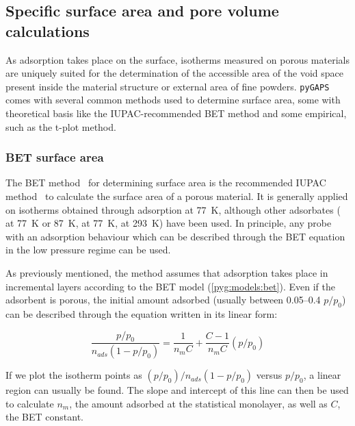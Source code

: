 
\subsection{Specific surface area and pore volume calculations}

As adsorption takes place on the surface,
isotherms measured on porous materials are uniquely suited
for the determination of the accessible area of the void
space present inside the material structure or external
area of fine powders. \texttt{pyGAPS} comes with several
common methods used to
determine surface area, some with theoretical basis like
the IUPAC-recommended BET method and some empirical, such
as the t-plot method.

\subsubsection{BET surface area}\label{pyg:charac:betarea}

The BET method~\cite{brunauerAdsorptionGasesMultimolecular1938}
for determining surface area is the recommended IUPAC method~\cite{thommesPhysisorptionGasesSpecial2015}
to calculate the surface area of a porous material.
It is generally applied on isotherms obtained through 
adsorption at \SI{77}{\kelvin}, although other adsorbates
( at \SI{77}{\kelvin} or \SI{87}{\kelvin},
 at \SI{77}{\kelvin},  at \SI{293}{\kelvin})
have been used. In principle, any probe with an adsorption behaviour
which can be described through the BET equation in the low pressure regime
can be used.

As previously mentioned, the method assumes that adsorption takes place
in incremental layers according to the
BET model (\autoref{pyg:models:bet}).
Even if the adsorbent is porous, the initial amount adsorbed
(usually between 0.05--0.4 \(p/p_0\)) can be
described through the equation written in its linear form:

\begin{equation}
	\frac{p/p_0}{n_{ads} (1-p/p_0)} = \frac{1}{n_{m} C} + \frac{C - 1}{n_{m} C}(p/p_0)
\end{equation}

If we plot the isotherm points as
\({(p/p_0)}/{n_{ads}(1-p/p_0)}\) versus \(p/p_0\), a linear region
can usually be found. The slope and intercept of this line
can then be used to calculate \(n_{m}\), the amount adsorbed at the
statistical monolayer, as well as \(C\), the BET constant.


